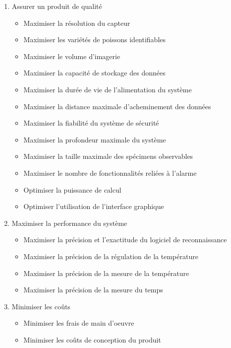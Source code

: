 \begin{enumerate}

    \item Assurer un produit de qualité
    \begin{itemize}
        \item Maximiser la résolution du capteur
        \item Maximiser les variétés de poissons identifiables
        \item Maximiser le volume d'imagerie
        \item Maximiser la capacité de stockage des données
        \item Maximiser la durée de vie de l'alimentation du système
        \item Maximiser la distance maximale d'acheminement des données
        \item Maximiser la fiabilité du système de sécurité
        \item Maximiser la profondeur maximale du système
        \item Maximiser la taille maximale des spécimens observables
        \item Maximiser le nombre de fonctionnalités reliées à l'alarme
        \item Optimiser la puissance de calcul
        \item Optimiser l'utilisation de l'interface graphique
    \end{itemize}
    
    \item Maximiser la performance du système
    \begin{itemize}
        \item Maximiser la précision et l'exactitude du logiciel de reconnaissance 
        \item Maximiser la précision de la régulation de la température
        \item Maximiser la précision de la mesure de la température
        \item Maximiser la précision de la mesure du temps
    \end{itemize}
    
    \item Minimiser les coûts
    \begin{itemize}
        \item Minimiser les frais de main d'oeuvre
        \item Minimiser les coûts de conception du produit
    \end{itemize}
    

\end{enumerate}
